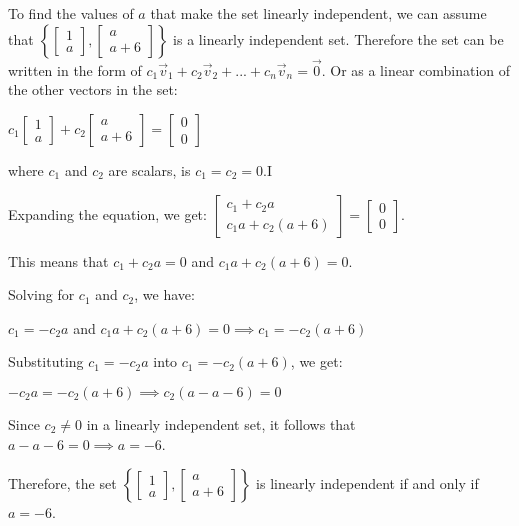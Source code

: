 \begin{enumerate}
To find the values of $a$ that make the set linearly independent, we can assume that $\left\{\left[\begin{array}{c}
1\\
a
\end{array}\right],\left[\begin{array}{c}
a\\
a+6\end{array}\right]\right\}$ is a linearly independent set. Therefore the set can be written in the form of $c_1 \vec{v}_1 + c_2 \vec{v}_2 + ... + c_n \vec{v}_n = \vec{0}$. Or as a linear combination of the other vectors in the set:
\begin{center}    
$c_1\left[\begin{array}{c}
1\\
a
\end{array}\right] + c_2\left[\begin{array}{c}
a\\
a+6
\end{array}\right] = \left[\begin{array}{c}
0\\
0
\end{array}\right]$

where $c_1$ and $c_2$ are scalars, is $c_1 = c_2 = 0$.I 
\end{center}
Expanding the equation, we get:
$\left[\begin{array}{c}
c_1 + c_2a\\
c_1a + c_2(a+6)
\end{array}\right] = \left[\begin{array}{c}
0\\
0
\end{array}\right]$.

This means that $c_1 + c_2a = 0$ and $c_1a + c_2(a+6) = 0$.

Solving for $c_1$ and $c_2$, we have:

$c_1 = -c_2a$ and $c_1a + c_2(a+6) = 0 \implies c_1 = -c_2(a + 6)$

Substituting $c_1 = -c_2a$ into $c_1 = -c_2(a + 6)$, we get:

$-c_2a = -c_2(a + 6) \implies c_2(a - a - 6) = 0$

Since $c_2 \neq 0$ in a linearly independent set, it follows that $a - a - 6 = 0 \implies a = -6$.

Therefore, the set $\left\{\left[\begin{array}{c}
1\\
a
\end{array}\right],\left[\begin{array}{c}
a\\
a+6\end{array}\right]\right\}$ is linearly independent if and only if $a = -6$.

\end{enumerate}
 

